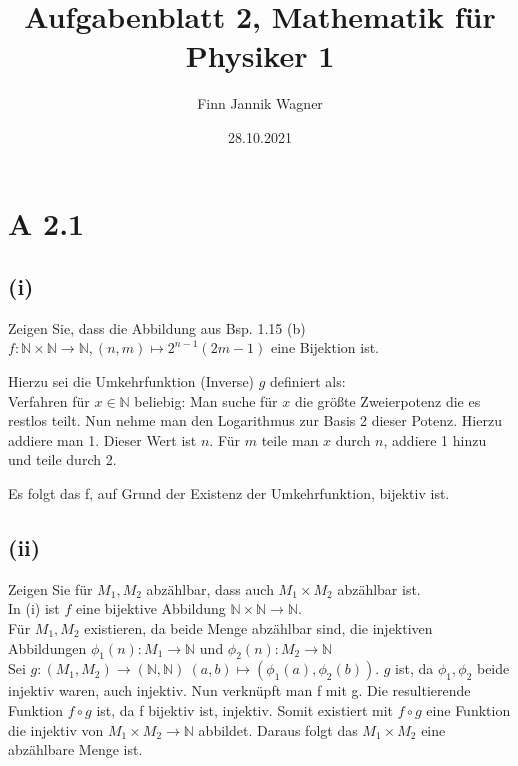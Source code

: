 \documentclass{article}
\date{28.10.2021}
\title{Aufgabenblatt 2, Mathematik für Physiker 1}
\author{Finn Jannik Wagner}
\begin{document}
    \maketitle
    
    \section*{A 2.1}
        \subsection*{(i)}
        \large Zeigen Sie, dass die Abbildung aus Bsp. 1.15 (b)
        \(f : \mathbb{N} \times \mathbb{N} \to \mathbb{N}, (n, m) \mapsto 2^{n-1} (2m -1)\)
        eine Bijektion ist.

        Hierzu sei die Umkehrfunktion (Inverse) \(g\) definiert als: \\
        Verfahren für \(x \in \mathbb{N}\) beliebig: 
        Man suche für \(x\) die größte Zweierpotenz die es restlos teilt. Nun nehme man den Logarithmus zur Basis 2 dieser Potenz.
        Hierzu addiere man 1. Dieser Wert ist \(n\).
        Für \(m\) teile man \(x\) durch \(n\), addiere 1 hinzu und teile durch 2.

        Es folgt das f, auf Grund der Existenz der Umkehrfunktion, bijektiv ist.
        
        \subsection*{(ii)}
            Zeigen Sie für \(M_1, M_2\) abzählbar, dass auch \(M_1 \times M_2\) abzählbar ist. \\
            In (i) ist \(f\) eine bijektive Abbildung \(\mathbb{N} \times \mathbb{N} \to \mathbb{N}\). \\
            Für \(M_1, M_2\) existieren, da beide Menge abzählbar sind, die injektiven Abbildungen \(\phi_1(n): M_1 \to \mathbb{N}\) und \(\phi_2(n): M_2 \to \mathbb{N}\) \\
            Sei \(g: (M_1, M_2) \to (\mathbb{N}, \mathbb{N}) \: (a, b) \mapsto (\phi_1(a), \phi_2(b))\).
            \(g\) ist, da \(\phi_1, \phi_2\) beide injektiv waren, auch injektiv.
            Nun verknüpft man f mit g. Die resultierende Funktion \(f \circ g\) ist, da f bijektiv ist, injektiv.
            Somit existiert mit \(f \circ g\) eine Funktion die injektiv von \(M_1 \times M_2 \to \mathbb{N}\) abbildet.
            Daraus folgt das \(M_1 \times M_2\) eine abzählbare Menge ist.
\end{document}
